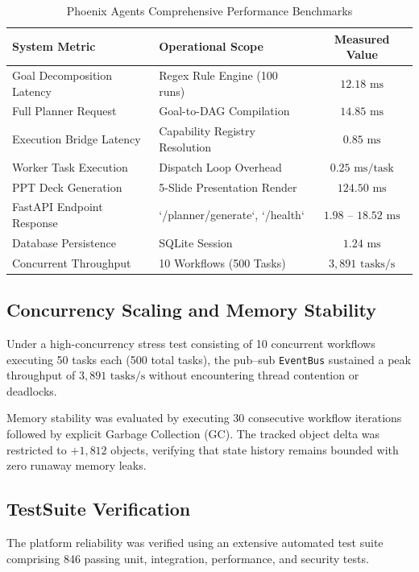 \documentclass[conference]{IEEEtran}
\begin{document}
\begin{table}[htbp]
\caption{Phoenix Agents Comprehensive Performance Benchmarks}
\label{tab:phoenix_performance}
\centering
\begin{tabular}{p{3.2cm} p{3.2cm} c}
\toprule
\textbf{System Metric} & \textbf{Operational Scope} & \textbf{Measured Value} \\
\midrule
Goal Decomposition Latency & Regex Rule Engine (100 runs) & $12.18\text{ ms}$ \\
Full Planner Request & Goal-to-DAG Compilation & $14.85\text{ ms}$ \\
Execution Bridge Latency & Capability Registry Resolution & $0.85\text{ ms}$ \\
Worker Task Execution & Dispatch Loop Overhead & $0.25\text{ ms/task}$ \\
PPT Deck Generation & 5-Slide Presentation Render & $124.50\text{ ms}$ \\
FastAPI Endpoint Response & `/planner/generate`, `/health` & $1.98\text{ -- }18.52\text{ ms}$ \\
Database Persistence & SQLite Session & $1.24\text{ ms}$ \\
Concurrent Throughput & 10 Workflows (500 Tasks) & $3,891\text{ tasks/s}$ \\
\bottomrule
\end{tabular}
\end{table}

\subsection{Concurrency Scaling and Memory Stability}
Under a high-concurrency stress test consisting of 10 concurrent workflows executing 50 tasks each (500 total tasks), the pub--sub \texttt{EventBus} sustained a peak throughput of $3,891\text{ tasks/s}$ without encountering thread contention or deadlocks.

Memory stability was evaluated by executing 30 consecutive workflow iterations followed by explicit Garbage Collection (GC). The tracked object delta was restricted to $+1,812$ objects, verifying that state history remains bounded with zero runaway memory leaks.

\subsection{TestSuite Verification}
The platform reliability was verified using an extensive automated test suite comprising 846 passing unit, integration, performance, and security tests.
\end{document}
